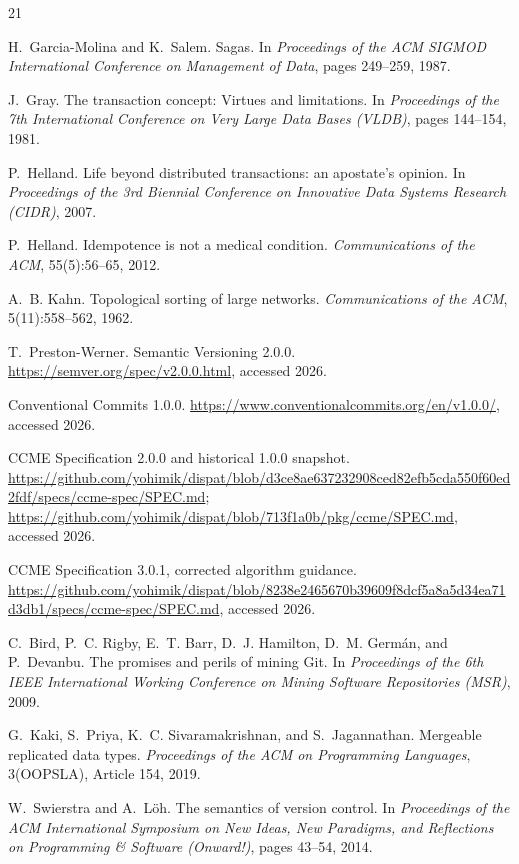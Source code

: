 \documentclass[sigconf,nonacm]{acmart}
\theoremstyle{acmplain}
\theoremstyle{acmdefinition}
\theoremstyle{acmplain}
\begin{document}
\vfuzz=2pt
\begin{thebibliography}{21}

H.~Garcia-Molina and K.~Salem.
Sagas.
In \emph{Proceedings of the ACM SIGMOD International Conference on
Management of Data}, pages 249--259, 1987.

J.~Gray.
The transaction concept: Virtues and limitations.
In \emph{Proceedings of the 7th International Conference on Very Large
Data Bases (VLDB)}, pages 144--154, 1981.

P.~Helland.
Life beyond distributed transactions: an apostate's opinion.
In \emph{Proceedings of the 3rd Biennial Conference on Innovative Data
Systems Research (CIDR)}, 2007.

P.~Helland.
Idempotence is not a medical condition.
\emph{Communications of the ACM}, 55(5):56--65, 2012.

A.~B. Kahn.
Topological sorting of large networks.
\emph{Communications of the ACM}, 5(11):558--562, 1962.

T.~Preston-Werner.
Semantic Versioning 2.0.0.
\url{https://semver.org/spec/v2.0.0.html}, accessed 2026.

Conventional Commits 1.0.0.
\url{https://www.conventionalcommits.org/en/v1.0.0/}, accessed 2026.

CCME Specification 2.0.0 and historical 1.0.0 snapshot.
\url{https://github.com/yohimik/dispat/blob/d3ce8ae637232908ced82efb5cda550f60ed2fdf/specs/ccme-spec/SPEC.md};
\url{https://github.com/yohimik/dispat/blob/713f1a0b/pkg/ccme/SPEC.md},
accessed 2026.

CCME Specification 3.0.1, corrected algorithm guidance.
\url{https://github.com/yohimik/dispat/blob/8238e2465670b39609f8dcf5a8a5d34ea71d3db1/specs/ccme-spec/SPEC.md},
accessed 2026.

C.~Bird, P.~C. Rigby, E.~T. Barr, D.~J. Hamilton, D.~M. Germ\'an, and
P.~Devanbu.
The promises and perils of mining Git.
In \emph{Proceedings of the 6th IEEE International Working Conference
on Mining Software Repositories (MSR)}, 2009.

G.~Kaki, S.~Priya, K.~C. Sivaramakrishnan, and S.~Jagannathan.
Mergeable replicated data types.
\emph{Proceedings of the ACM on Programming Languages},
3(OOPSLA), Article 154, 2019.

W.~Swierstra and A.~L\"oh.
The semantics of version control.
In \emph{Proceedings of the ACM International Symposium on New Ideas,
New Paradigms, and Reflections on Programming \& Software (Onward!)},
pages 43--54, 2014.


\end{thebibliography}
\end{document}

